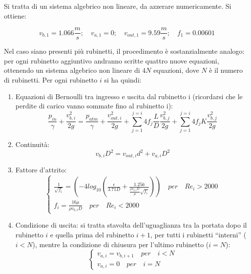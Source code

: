 \documentclass[oneside]{article}
\begin{document}
Si tratta di un sistema algebrico non lineare, da azzerare numericamente. Si ottiene:

\begin{equation*}
    v_{b,1} = 1.066\frac{m}{s}; \quad v_{a,1} = 0; \quad v_{out,1} = 9.59\frac{m}{s};
    \quad f_{1} = 0.00601
\end{equation*}

Nel caso siano presenti più rubinetti, il procedimento è sostanzialmente analogo: per
ogni rubinetto aggiuntivo andranno scritte quattro nuove equazioni, ottenendo un sistema
algebrico non lineare di $4N$ equazioni, dove $N$ è il numero di rubinetti. Per ogni
rubinetto $i$ si ha quindi:
\begin{enumerate}
   \item Equazioni di Bernoulli tra ingresso e uscita dal rubinetto i (ricordarsi che le
      perdite di carico vanno sommate fino al rubinetto i):
      \begin{equation*}
         \frac{p_{in}}{\gamma} + \frac{v_{b,i}^{2}}{2g} = \frac{p_{atm}}{\gamma} +
         \frac{v_{out,i}^{2}}{2g} + \sum_{j = 1}^{j =
         i}4f_{j}\frac{L}{D}\frac{v_{b,j}^{2}}{2g} + \sum_{j = 1}^{j = i}4f_{j}
         K\frac{v_{b,j}^{2}}{2g}
      \end{equation*}

   \item Continuità:
      \begin{equation*}
         v_{b,i}D^{2} = v_{out,i}d^{2} + v_{a,i}D^{2}
      \end{equation*}

   \item Fattore d'attrito:
      \begin{equation*}
         \begin{cases}
            \frac{1}{\sqrt{f_{i}}} =
            \left(-4log_{10}\left(\frac{\epsilon}{3.71D}+\frac{1.256}{\frac{\rho
            v_{b,i}D}{\mu}\sqrt{f_{i}}}\right)\right) \quad per \quad Re_{i} > 2000 \\
            f_{i} = \frac{16 \mu}{\rho v_{b,i}D} \quad per \quad Re_{i} < 2000
         \end{cases}
      \end{equation*}

   \item Condizione di uscita: si tratta stavolta dell’uguaglianza tra la portata dopo il
      rubinetto $i$ e quella prima del rubinetto $i + 1$, per tutti i rubinetti “interni”
      ($i < N$), mentre la condizione di chiusura per l’ultimo rubinetto ($i = N$):
      \begin{equation*}
         \begin{cases}
            v_{a,i} = v_{b,i+1} \quad per \quad i < N \\
            v_{a,i} = 0 \quad per \quad i = N
         \end{cases}
      \end{equation*}
\end{enumerate}
\end{document}
